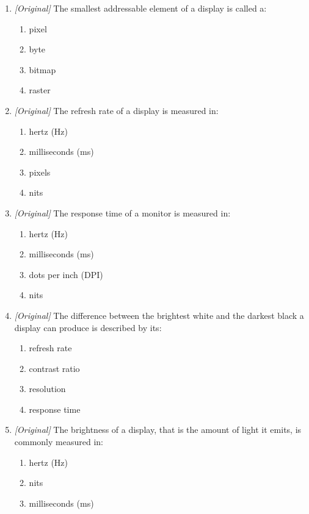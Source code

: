 \begin{enumerate}[label=\textbf{Q\arabic*.}, leftmargin=*]
\begin{enumerate}[label=\Alph*.]
    \item response time
    \item contrast ratio
  \end{enumerate}
\item \textit{[Original]} The smallest addressable element of a display is
  called a:
  \begin{enumerate}[label=\Alph*.]
    \item pixel
    \item byte
    \item bitmap
    \item raster
  \end{enumerate}
\item \textit{[Original]} The refresh rate of a display is measured in:
  \begin{enumerate}[label=\Alph*.]
    \item hertz (Hz)
    \item milliseconds (ms)
    \item pixels
    \item nits
  \end{enumerate}
\item \textit{[Original]} The response time of a monitor is measured in:
  \begin{enumerate}[label=\Alph*.]
    \item hertz (Hz)
    \item milliseconds (ms)
    \item dots per inch (DPI)
    \item nits
  \end{enumerate}
\item \textit{[Original]} The difference between the brightest white and the
  darkest black a display can produce is described by its:
  \begin{enumerate}[label=\Alph*.]
    \item refresh rate
    \item contrast ratio
    \item resolution
    \item response time
  \end{enumerate}
\item \textit{[Original]} The brightness of a display, that is the amount of
  light it emits, is commonly measured in:
  \begin{enumerate}[label=\Alph*.]
    \item hertz (Hz)
    \item nits
    \item milliseconds (ms)

\end{enumerate}
\end{enumerate}
